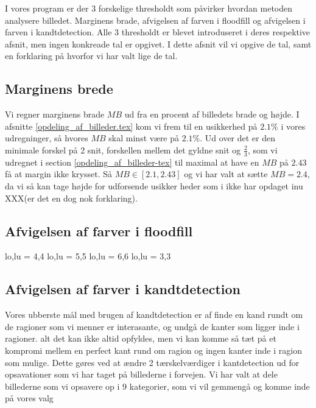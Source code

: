 I vores program er der 3 forskelige thresholdt som påvirker hvordan
metoden analysere billedet. Marginens brade, afvigelsen af farven i
floodfill og afvigelsen i farven i kandtdetection. Alle 3 thresholdt er
blevet introduseret i deres respektive afsnit, men ingen konkreade tal
er opgivet. I dette afsnit vil vi opgive de tal, samt en forklaring på
hvorfor vi har valt lige de tal.

\subsection{Marginens brede}
Vi regner marginens brade $MB$ ud fra en procent af billedets brade og
højde. I afsnitte \ref{opdeling_af_billeder.tex} kom vi frem til en
usikkerhed på $2.1 \%$ i vores udregninger, så hvores $MB$ skal minst
være på $2.1 \%$. Ud over det er den minimale forskel på 2 snit,
forskellen mellem det gyldne snit og $\frac{2}{3}$, som vi udregnet i
section \ref{opdeling_af_billeder-tex} til maximal at have en $MB$ på
$2.43$ få at margin ikke krysset. Så $MB \in [2.1, 2.43]$ og vi har valt
at sætte $MB = 2.4$, da vi så kan tage højde for udforsende usikker
heder som i ikke har opdaget inu XXX(er det en dog nok forklaring).

\subsection{Afvigelsen af farver i floodfill}

lo,lu = 4,4
lo,lu = 5,5
lo,lu = 6,6
lo,lu = 3,3

\subsection{Afvigelsen af farver i kandtdetection}
Vores ubberste mål med brugen af kandtdetection er af finde en kand rundt om de ragioner som vi menner er interasante, og undgå de kanter som ligger inde i ragioner. alt det kan ikke altid opfyldes, men vi kan komme så tæt på et kompromi mellem en perfect kant rund om ragion og ingen kanter inde i ragion som mulige. Dette gøres ved at ændre 2 tærskelværdiger i kantdetection ud for opsavationer som vi har taget på billederne i forvejen. Vi har valt at dele billederne som vi opsavere op i 9 kategorier, som vi vil gemmengå og komme inde på vores valg

